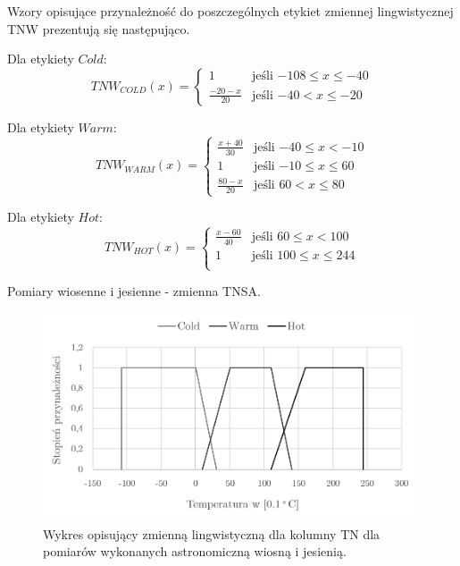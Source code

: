 \documentclass{classrep}
\begin{document}
Wzory opisujące przynależność do poszczególnych etykiet zmiennej lingwistycznej TNW prezentują się następująco. \newline

Dla etykiety $Cold$:
\begin{equation}
{TNW}_{COLD}(x)= \left\{ \begin{array}{ll}
1 			& \textrm{jeśli $-108 \leq x \leq -40$} \\
\frac{-20-x}{20} 	& \textrm{jeśli $-40 < x \leq -20$}
\end{array} \right.
\end{equation}

Dla etykiety $Warm$:
\begin{equation}
{TNW}_{WARM}(x)= \left\{ \begin{array}{ll}
\frac{x+40}{30} 	 & \textrm{jeśli $-40 \leq x < -10$} \\
1 			 & \textrm{jeśli $-10 \leq x \leq 60$} \\
\frac{80-x}{20} & \textrm{jeśli $60 < x \leq 80$}
\end{array} \right.
\end{equation}

Dla etykiety $Hot$:
\begin{equation}
{TNW}_{HOT}(x)= \left\{ \begin{array}{ll}
\frac{x-60}{40} & \textrm{jeśli $60 \leq x < 100$} \\
1 			 & \textrm{jeśli $100 \leq x \leq 244$} \\
\end{array} \right.
\end{equation}

Pomiary wiosenne i jesienne - zmienna TNSA.
\begin{figure}[H]
	\centering
	\includegraphics[width=0.99\textwidth]{Pictures/TermsCharts/TN_WJ.png}
	\caption{Wykres opisujący zmienną lingwistyczną dla kolumny TN dla pomiarów wykonanych astronomiczną wiosną i jesienią.}
\end{figure}
\end{document}
